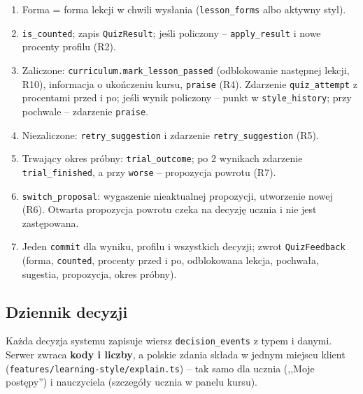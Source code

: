 \begin{enumerate}[leftmargin=*]
    \item Forma = forma lekcji w chwili wysłania (\texttt{lesson\_forms} albo aktywny styl).
    \item \texttt{is\_counted}; zapis \texttt{QuizResult}; jeśli policzony -- \texttt{apply\_result} i nowe procenty profilu (R2).
    \item Zaliczone: \texttt{curriculum.mark\_lesson\_passed} (odblokowanie następnej lekcji, R10), informacja o ukończeniu kursu, \texttt{praise} (R4). Zdarzenie \texttt{quiz\_attempt} z procentami przed i po; jeśli wynik policzony -- punkt w \texttt{style\_history}; przy pochwale -- zdarzenie \texttt{praise}.
    \item Niezaliczone: \texttt{retry\_suggestion} i zdarzenie \texttt{retry\_suggestion} (R5).
    \item Trwający okres próbny: \texttt{trial\_outcome}; po 2 wynikach zdarzenie \texttt{trial\_finished}, a przy \texttt{worse} -- propozycja powrotu (R7).
    \item \texttt{switch\_proposal}: wygaszenie nieaktualnej propozycji, utworzenie nowej (R6). Otwarta propozycja powrotu czeka na decyzję ucznia i nie jest zastępowana.
    \item Jeden \texttt{commit} dla wyniku, profilu i wszystkich decyzji; zwrot \texttt{QuizFeedback} (forma, \texttt{counted}, procenty przed i po, odblokowana lekcja, pochwała, sugestia, propozycja, okres próbny).
\end{enumerate}

\subsection{Dziennik decyzji}

Każda decyzja systemu zapisuje wiersz \texttt{decision\_events} z typem i danymi. Serwer zwraca \textbf{kody i liczby}, a polskie zdania składa w jednym miejscu klient (\nolinkurl{features/learning-style/explain.ts}) -- tak samo dla ucznia (,,Moje postępy'') i nauczyciela (szczegóły ucznia w panelu kursu).

